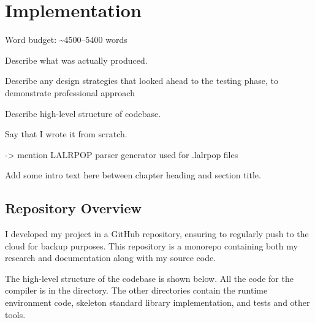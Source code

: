 \documentclass[00-main.tex]{subfiles}
\begin{document}
\chapter{Implementation}

\begin{mrwComment}
Word budget: \textasciitilde 4500--5400 words
\end{mrwComment}

\begin{mrwComment}
Describe what was actually produced.

Describe any design strategies that looked ahead to the testing phase, to demonstrate professional approach
\end{mrwComment}
\begin{mrwComment}
Describe high-level structure of codebase.

Say that I wrote it from scratch.

-> mention LALRPOP parser generator used for .lalrpop files
\end{mrwComment}

\begin{mrwComment}
Add some intro text here between chapter heading and section title.
\end{mrwComment}

\section{Repository Overview}

I developed my project in a GitHub repository, ensuring to regularly push to the cloud for backup purposes.
This repository is a monorepo containing both my research and documentation along with my source code.

The high-level structure of the codebase is shown below.
All the code for the compiler is in the  directory.
The other directories contain the runtime environment code, skeleton standard library implementation, and tests and other tools.

\newlength\IndentWidth
\setlength\IndentWidth{1em}
\end{document}
